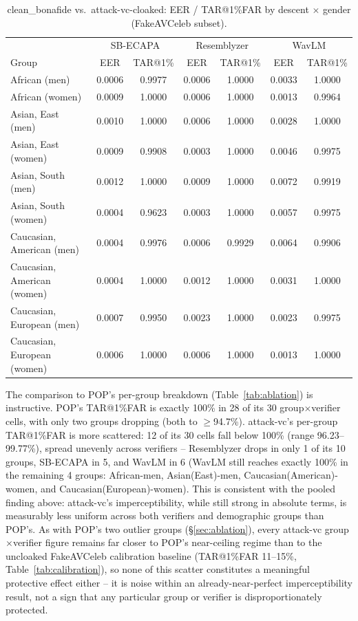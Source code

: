 \documentclass[11pt]{article}
\begin{document}
\begin{table}[H]
\centering
\caption{clean\_bonafide vs.\ attack-vc-cloaked: EER / TAR@1\%FAR by
descent $\times$ gender (FakeAVCeleb subset).}
\label{tab:ablation-attackvc}
\begin{tabular}{lcccccc}
\toprule
& \multicolumn{2}{c}{SB-ECAPA} & \multicolumn{2}{c}{Resemblyzer} & \multicolumn{2}{c}{WavLM} \\
Group & EER & TAR@1\% & EER & TAR@1\% & EER & TAR@1\% \\
\midrule
African (men)               & 0.0006 & 0.9977 & 0.0006 & 1.0000 & 0.0033 & 1.0000 \\
African (women)              & 0.0009 & 1.0000 & 0.0006 & 1.0000 & 0.0013 & 0.9964 \\
Asian, East (men)            & 0.0010 & 1.0000 & 0.0006 & 1.0000 & 0.0028 & 1.0000 \\
Asian, East (women)          & 0.0009 & 0.9908 & 0.0003 & 1.0000 & 0.0046 & 0.9975 \\
Asian, South (men)           & 0.0012 & 1.0000 & 0.0009 & 1.0000 & 0.0072 & 0.9919 \\
Asian, South (women)         & 0.0004 & 0.9623 & 0.0003 & 1.0000 & 0.0057 & 0.9975 \\
Caucasian, American (men)    & 0.0004 & 0.9976 & 0.0006 & 0.9929 & 0.0064 & 0.9906 \\
Caucasian, American (women)  & 0.0004 & 1.0000 & 0.0012 & 1.0000 & 0.0031 & 1.0000 \\
Caucasian, European (men)    & 0.0007 & 0.9950 & 0.0023 & 1.0000 & 0.0023 & 0.9975 \\
Caucasian, European (women)  & 0.0006 & 1.0000 & 0.0006 & 1.0000 & 0.0013 & 1.0000 \\
\bottomrule
\end{tabular}
\end{table}

The comparison to POP's per-group breakdown (Table~\ref{tab:ablation})
is instructive. POP's TAR@1\%FAR is exactly 100\% in 28 of its 30
group$\times$verifier cells, with only two groups dropping (both to
$\geq$94.7\%). attack-vc's per-group TAR@1\%FAR is more scattered: 12
of its 30 cells fall below 100\% (range 96.23--99.77\%), spread
unevenly across verifiers -- Resemblyzer drops in only 1 of its 10
groups, SB-ECAPA in 5, and WavLM in 6 (WavLM still reaches exactly
100\% in the remaining 4 groups: African-men, Asian(East)-men,
Caucasian(American)-women, and Caucasian(European)-women). This is
consistent with the pooled finding above: attack-vc's imperceptibility,
while still strong in absolute terms, is measurably less uniform
across both verifiers and demographic groups than POP's. As with
POP's two outlier groups (\S\ref{sec:ablation}), every attack-vc
group$\times$verifier figure remains far closer to POP's near-ceiling
regime than to the uncloaked FakeAVCeleb calibration baseline
(TAR@1\%FAR 11--15\%, Table~\ref{tab:calibration}), so none of this
scatter constitutes a meaningful protective effect either -- it is
noise within an already-near-perfect imperceptibility result, not a
sign that any particular group or verifier is disproportionately
protected.
\end{document}
